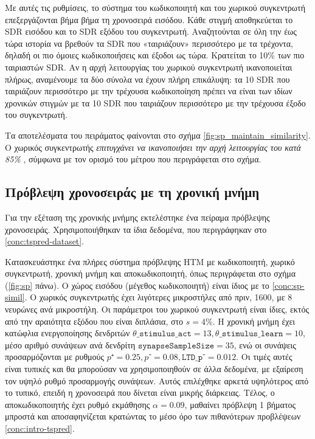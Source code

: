 	Με αυτές τις ρυθμίσεις, το σύστημα του κωδικοποιητή και του χωρικού συγκεντρωτή επεξεργάζονται βήμα βήμα τη χρονοσειρά εισόδου.
	Κάθε στιγμή αποθηκεύεται το SDR εισόδου και το SDR εξόδου του συγκεντρωτή.
	Αναζητούνται σε όλη την έως τώρα ιστορία να βρεθούν τα SDR που «ταιριάζουν» περισσότερο με τα τρέχοντα,
	δηλαδή οι πιο όμοιες κωδικοποιήσεις και έξοδοι ως τώρα.
	Κρατείται το 10\% των πιο ταιριαστών SDR.
	Αν η αρχή λειτουργίας του χωρικού συγκεντρωτή ικανοποιείται πλήρως,
	αναμένουμε τα δύο σύνολα να έχουν πλήρη επικάλυψη:
	τα 10 SDR που ταιριάζουν περισσότερο με την τρέχουσα κωδικοποίηση πρέπει να είναι των ιδίων χρονικών στιγμών
	με τα 10 SDR που ταιριάζουν περισσότερο με την τρέχουσα έξοδο του συγκεντρωτή.

	Τα αποτελέσματα του πειράματος φαίνονται στο σχήμα \ref{fig:sp_maintain_similarity}.
	Ο χωρικός συγκεντρωτής \textit{επιτυγχάνει να ικανοποιήσει την αρχή λειτουργίας του κατά 85\% },
	σύμφωνα με τον ορισμό του μέτρου που περιγράφεται στο σχήμα.

\subsection{Πρόβλεψη χρονοσειράς με τη χρονική μνήμη} \label{conc:tm-pred}

	Για την εξέταση της χρονικής μνήμης εκτελέστηκε ένα πείραμα πρόβλεψης χρονοσειράς.
	Χρησιμοποιήθηκαν τα ίδια δεδομένα, που περιγράφηκαν στο \ref{conc:tspred-dataset}.

	Κατασκευάστηκε ένα πλήρες σύστημα πρόβλεψης HTM με κωδικοποιητή, χωρικό συγκεντρωτή, χρονική μνήμη και αποκωδικοποιητή,
	όπως περιγράφεται στο σχήμα (\ref{fig:sp} πάνω).
	Ο χώρος εισόδου (μέγεθος κωδικοποιητή) είναι ίδιος με το \ref{conc:sp-simil}.
	Ο χωρικός συγκεντρωτής έχει λιγότερες μικροστήλες από πριν, 1600, με 8 νευρώνες ανά μικροστήλη.
	Οι παράμετροι του χωρικού συγκεντρωτή είναι ίδιες, εκτός από την αραιότητα εξόδου που είναι διπλάσια, στο $s=4\%$.
	Η χρονική μνήμη έχει κατώφλια ενεργοποίησης δενδριτών $\mathtt{θ\_stimulus\_act}=13, \mathtt{θ\_stimulus\_learn}=10$,
	μέσο αριθμό συνάψεων ανά δενδρίτη $\mathtt{synapseSampleSize}=35$,
	ενώ οι συνάψεις προσαρμόζονται με ρυθμούς $p⁺=0.25,p⁻=0.08,\mathtt{LTD\_p⁻}= 0.012$.
	Οι τιμές αυτές είναι τυπικές και θα μπορούσαν να χρησιμοποιηθούν σε άλλα δεδομένα, με εξαίρεση τον υψηλό ρυθμό προσαρμογής συνάψεων.
	Αυτός επιλέχθηκε αρκετά υψηλότερος από το τυπικό, επειδή η χρονοσειρά που δίνεται είναι μικρής διάρκειας.
	Τέλος, ο αποκωδικοποιητής έχει ρυθμό εκμάθησης $α=0.09$, μαθαίνει πρόβλεψη 1 βήματος μπροστά
	και αποσαφηνίζεται κρατώντας το μέσο όρο των πιθανότερων προβλέψεων \ref{conc:intro-tspred}.

